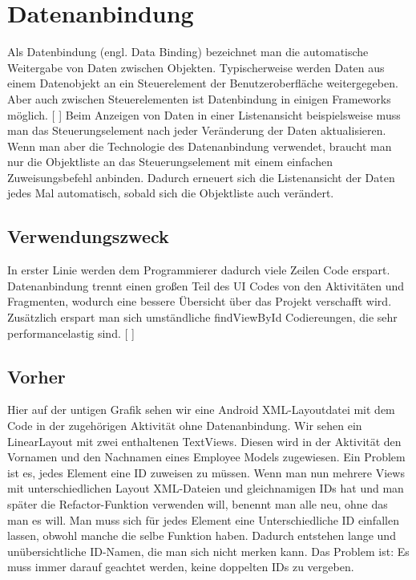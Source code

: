 \documentclass[FIPLY_base.tex]{subfiles}
\begin{document}
\section{Datenanbindung}
Als Datenbindung (engl. Data Binding) bezeichnet man die automatische Weitergabe von Daten zwischen Objekten. Typischerweise werden Daten aus einem Datenobjekt an ein Steuerelement der Benutzeroberfläche weitergegeben. Aber auch zwischen Steuerelementen ist Datenbindung in einigen Frameworks möglich. [ \cite{datbdef}]
\newline
Beim Anzeigen von Daten in einer Listenansicht beispielsweise muss man das Steuerungselement nach jeder Veränderung der Daten aktualisieren. Wenn man aber die Technologie des Datenanbindung verwendet, braucht man nur die Objektliste an das Steuerungselement mit einem einfachen Zuweisungsbefehl anbinden. Dadurch erneuert sich die Listenansicht der Daten jedes Mal automatisch, sobald sich die Objektliste auch verändert.


\subsection{Verwendungszweck}
In erster Linie werden dem Programmierer dadurch viele Zeilen Code erspart. Datenanbindung trennt einen großen Teil des UI Codes von den Aktivitäten und Fragmenten, wodurch eine bessere Übersicht über das Projekt verschafft wird. Zusätzlich erspart man sich umständliche findViewById Codiereungen, die sehr performancelastig sind. [ \cite{datbusing}]


\subsection{Vorher}

Hier auf der untigen Grafik sehen wir eine Android XML-Layoutdatei mit dem Code in der zugehörigen Aktivität ohne Datenanbindung. Wir sehen ein LinearLayout mit zwei enthaltenen TextViews. Diesen wird in der Aktivität den Vornamen und den Nachnamen eines Employee Models zugewiesen. Ein Problem ist es, jedes Element eine ID zuweisen zu müssen. Wenn man nun mehrere Views mit unterschiedlichen Layout XML-Dateien und gleichnamigen IDs hat und man später die Refactor-Funktion verwenden will, benennt man alle neu, ohne das man es will. Man muss sich für jedes Element eine Unterschiedliche ID einfallen lassen, obwohl manche die selbe Funktion haben. Dadurch entstehen lange und unübersichtliche ID-Namen, die man sich nicht merken kann. Das Problem ist: Es muss immer darauf geachtet werden, keine doppelten IDs zu vergeben.\\
\end{document}

